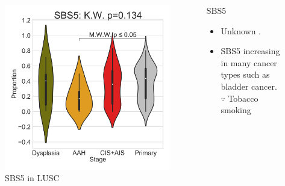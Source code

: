 \documentclass{beamer}
\begin{document}
\begin{frame}[allowframebreaks]
                    \begin{columns}
                        \begin{column}{0.4 \textwidth}
                            \begin{figure}
                                \includegraphics[width=\linewidth]{figures/SigProfiler/BWA-Violin/COSMIC-SingleBase.SQC.Subtype.Relative/SBS5.pdf}
                                \caption{SBS5 in LUSC}
                            \end{figure}
                        \end{column}
                        \begin{column}{0.55 \textwidth}
                            \begin{block}{SBS5}
                                \begin{itemize}
                                    \item Unknown \cite{signature-02}.
                                    \item SBS5 increasing in many cancer types such as bladder cancer. \\
                                        $\because$ Tobacco smoking
                                \end{itemize}
                            \end{block}
                        \end{column}
                    \end{columns}
                \end{frame}
\end{document}
